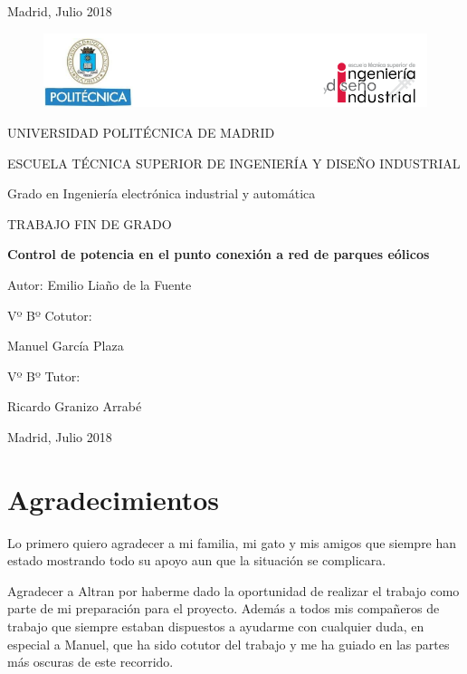 \documentclass{book}
\begin{document}
\begin{flushright}
\vfill
	Madrid, Julio 2018
\end{flushright}
\afterpage{\null\newpage}
\newpage
\begin{figure}[h!]
\centering
\includegraphics[width=\textwidth]{Encabezado.PNG}
\end{figure}
\begin{center}
	\LARGE
	UNIVERSIDAD POLIT\'ECNICA DE MADRID \par
	\vspace {10 mm}
	ESCUELA T\'ECNICA SUPERIOR DE INGENIER\'IA Y DISEÑO INDUSTRIAL\par
	\vspace {10 mm}
	\LARGE
	Grado en Ingenier\'ia electr\'onica industrial y autom\'atica \par
	\vspace {10 mm}
	\Huge
	TRABAJO FIN DE GRADO \par
	\vspace{20 mm}
	\LARGE
	\textbf{Control de potencia en el punto conexi\'on a red de parques e\'olicos}\par
	\vspace {10 mm}
	Autor: Emilio Liaño de la Fuente \par
	\vspace {10 mm}
\end{center}
\begin{multicols}{2}
	\LARGE
	Vº Bº Cotutor:

	Manuel Garc\'ia Plaza \par
	Vº Bº Tutor:

	Ricardo Granizo Arrab\'e
\vfill
		
\end{multicols}

\begin{flushright}
\vfill
	Madrid, Julio 2018
\end{flushright}
\afterpage{\null\newpage}
\newpage
\normalsize
{}

\chapter*{Agradecimientos}

Lo primero quiero agradecer a mi familia, mi gato y mis amigos que siempre han estado mostrando todo su apoyo aun que la situaci\'on se complicara. 

Agradecer a Altran por haberme dado la oportunidad de realizar el trabajo como parte de mi preparaci\'on para el proyecto. Adem\'as a todos mis compañeros de trabajo que siempre estaban dispuestos a ayudarme con cualquier duda, en especial a Manuel, que ha sido cotutor del trabajo y me ha guiado en las partes m\'as oscuras de este recorrido.
\end{document}
